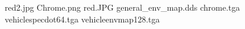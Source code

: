 red2.jpg
Chrome.png
red.JPG
general_env_map.dds
chrome.tga
vehiclespecdot64.tga
vehicleenvmap128.tga
